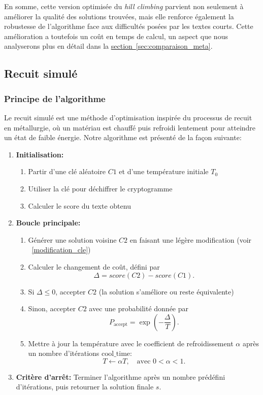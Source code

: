 \documentclass[a4paper]{article}
\begin{document}
En somme, cette version optimisée du \textit{hill climbing} parvient non seulement à améliorer la qualité des solutions trouvées, mais elle renforce également la robustesse de l’algorithme face aux difficultés posées par les textes courts. Cette amélioration a toutefois un coût en temps de calcul, un aspect que nous analyserons plus en détail dans la \hyperref[sec:comparaison_meta]{section~\ref*{sec:comparaison_meta}}.

\subsection{Recuit simulé}
\subsubsection{Principe de l'algorithme}

Le recuit simulé est une méthode d’optimisation inspirée du processus de recuit en métallurgie, où un matériau est chauffé puis refroidi lentement pour atteindre un état de faible énergie.
Notre algorithme est présenté de la façon suivante:
\begin{enumerate}
    \item \textbf{Initialisation:} 
    \begin{enumerate}
        \item Partir d'une clé aléatoire $C1$ et d'une température initiale $T_0$
        \item Utiliser la clé pour déchiffrer le cryptogramme
        \item Calculer le score du texte obtenu
    \end{enumerate}
    \item \textbf{Boucle principale:}
    \begin{enumerate}[label= (\alph*)]
        \item Générer une solution voisine $C2$ en faisant une légère modification (voir ~\ref{modification_cle})
        \item Calculer le changement de coût, défini par
        \[
            \Delta = score(C2) - score(C1).
        \]
        \item Si $\Delta \leq 0$, accepter $C2$ (la solution s'améliore ou reste équivalente)
        \item Sinon, accepter $C2$ avec une probabilité donnée par
        \[
            P_{\text{accept}} = \exp\left(-\frac{\Delta}{T}\right).
        \]
        \item Mettre à jour la température avec le coefficient de refroidissement $\alpha$ après un nombre d'itérations \(\text{cool\_time}\):
        \[
            T \leftarrow \alpha T, \quad \text{avec } 0 < \alpha < 1.
        \]
    \end{enumerate}
    
    \item \textbf{Critère d'arrêt:} Terminer l'algorithme après un nombre prédéfini d'itérations, puis retourner la solution finale $s$.
\end{enumerate}
\end{document}
